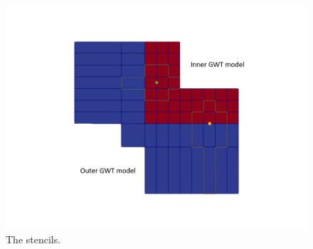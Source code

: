 \begin{figure}[!ht]
	\begin{center}
	\includegraphics[scale=0.5]{./Figures/InterfaceModel/gwt-ifmod-stencils.png}
	\caption[The stencils]{The stencils.}
	\label{fig:gwtgwt-fullgrid}
	\end{center}
\end{figure}